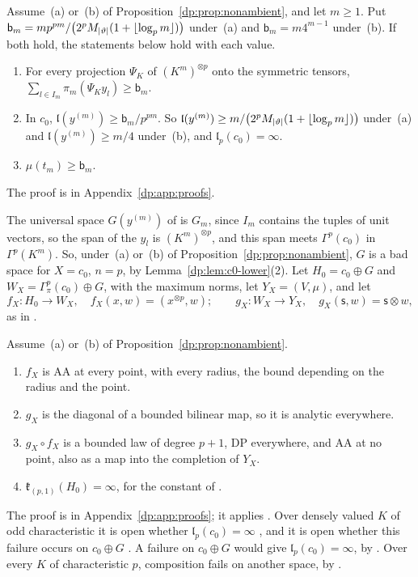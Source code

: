 \begin{lemma}\label{dp:lem:c0-lower}
Assume~\textup{(a)} or~\textup{(b)} of Proposition~\ref{dp:prop:nonambient}, and let $m\ge1$. Put $\mathsf b_m=mp^{pm}/\bigl(2^pM_{\lvert \vartheta\rvert}(1+\lfloor\log_pm\rfloor)\bigr)$ under~\textup{(a)} and $\mathsf b_m=m4^{m-1}$ under~\textup{(b)}. If both hold, the statements below hold with each value.
\begin{enumerate}
\item For every projection $\Psi_K$ of $(K^m)^{\otimes p}$ onto the symmetric tensors, $\sum_{l\in I_m}\pi_m(\Psi_Ky_l)\ge\mathsf b_m$.
\item In $c_0$, $\mathfrak l(y^{(m)})\ge\mathsf b_m/p^{pm}$. So $\mathfrak l(y^{(m)})\ge m/\bigl(2^pM_{\lvert \vartheta\rvert}(1+\lfloor\log_pm\rfloor)\bigr)$ under~\textup{(a)} and $\mathfrak l(y^{(m)})\ge m/4$ under~\textup{(b)}, and $\mathfrak l_p(c_0)=\infty$.
\item $\mu(t_m)\ge\mathsf b_m$.
\end{enumerate}
\end{lemma}
The proof is in Appendix~\ref{dp:app:proofs}.

The universal space $G(y^{(m)})$ of \cite[Definition~14.15]{I} is $G_m$, since $I_m$ contains the tuples of unit vectors, so the span of the $y_l$ is $(K^m)^{\otimes p}$, and this span meets $\Gamma^p(c_0)$ in $\Gamma^p(K^m)$. So, under~(a) or~(b) of Proposition~\ref{dp:prop:nonambient}, $G$ is a bad space for $X=c_0$, $n=p$, by Lemma~\ref{dp:lem:c0-lower}(2). Let $H_0=c_0\oplus G$ and $W_X=\Gamma^p_\pi(c_0)\oplus G$, with the maximum norms, let $Y_X=(V,\mu)$, and let
\[
 f_X\colon H_0\to W_X,\quad f_X(x,w)=(x^{\otimes p},w);\qquad
 g_X\colon W_X\to Y_X,\quad g_X(\mathsf s,w)=\mathsf s\otimes w,
\]
as in \cite[(14.5)]{I}.

\begin{theorem}\label{dp:thm:c0-failure}
Assume~\textup{(a)} or~\textup{(b)} of Proposition~\ref{dp:prop:nonambient}.
\begin{enumerate}
\item $f_X$ is AA at every point, with every radius, the bound depending on the radius and the point.
\item $g_X$ is the diagonal of a bounded bilinear map, so it is analytic everywhere.
\item $g_X\circ f_X$ is a bounded law of degree $p+1$, DP everywhere, and AA at no point, also as a map into the completion of $Y_X$.
\item $\mathfrak k_{(p,1)}(H_0)=\infty$, for the constant of \cite[Definition~14.21]{I}.
\end{enumerate}
\end{theorem}
The proof is in Appendix~\ref{dp:app:proofs}; it applies \cite[Proposition~14.18]{I}. Over densely valued $K$ of odd characteristic it is open whether $\mathfrak l_p(c_0)=\infty$ \cite[Question~14.42(2)]{I}, and it is open whether this failure occurs on $c_0\oplus G$ \cite[Remark~14.20]{I}. A failure on $c_0\oplus G$ would give $\mathfrak l_p(c_0)=\infty$, by \cite[Theorem~14.24]{I}. Over every $K$ of characteristic $p$, composition fails on another space, by \cite[Theorem~14.17]{I}.

